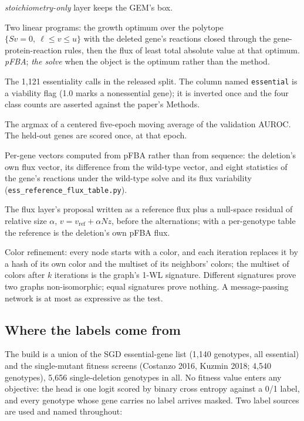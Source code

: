 \begin{description}
    \emph{stoichiometry-only} layer keeps the GEM's box.
  \item[parsimonious FBA] Two linear programs: the growth optimum over the polytope
    $\{Sv = 0,\ \ell \le v \le u\}$ with the deleted gene's reactions closed through the
    gene-protein-reaction rules, then the flux of least total absolute value at that
    optimum. \emph{pFBA}; \emph{the solve} when the object is the optimum rather than the
    method.
  \item[released labels] The 1,121 essentiality calls in the released split. The column
    named \texttt{essential} is a viability flag (1.0 marks a nonessential gene); it is
    inverted once and the four class counts are asserted against the paper's Methods.
  \item[selected epoch] The argmax of a centered five-epoch moving average of the
    validation AUROC. The held-out genes are scored once, at that epoch.
  \item[solve-derived encodings] Per-gene vectors computed from pFBA rather than from
    sequence: the deletion's own flux vector, its difference from the wild-type vector,
    and eight statistics of the gene's reactions under the wild-type solve and its flux
    variability (\texttt{ess\_reference\_flux\_table.py}).
  \item[warm start] The flux layer's proposal written as a reference flux plus a
    null-space residual of relative size $\alpha$, $v = v_{\text{ref}} + \alpha N z$,
    before the alternations; with a per-genotype table the reference is the deletion's
    own pFBA flux.
  \item[Weisfeiler-Leman test] Color refinement: every node starts with a color, and
    each iteration replaces it by a hash of its own color and the multiset of its
    neighbors' colors; the multiset of colors after $k$ iterations is the graph's 1-WL
    signature. Different signatures prove two graphs non-isomorphic; equal signatures
    prove nothing. A message-passing network is at most as expressive as the test.
\end{description}

\subsection{Where the labels come from}

The build is a union of the SGD essential-gene list (1,140 genotypes, all essential) and
the single-mutant fitness screens (Costanzo 2016, Kuzmin 2018; 4,540 genotypes), 5,656
single-deletion genotypes in all. No fitness value enters any objective: the head is one
logit scored by binary cross entropy against a 0/1 label, and every genotype whose gene
carries no label arrives masked. Two label sources are used and named throughout:

